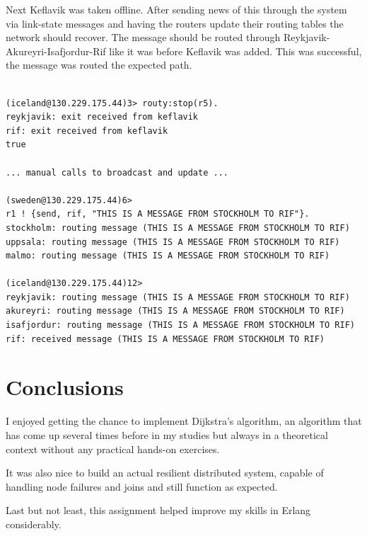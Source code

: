 \documentclass[a4paper, 11pt]{article}
\begin{document}
Next Keflavik was taken offline. After sending news of this through the system via link-state messages and having the routers update their routing tables the network should recover. The message should be routed through Reykjavik-Akureyri-Isafjordur-Rif like it was before Keflavik was added. This was successful, the message was routed the expected path.

\begin{verbatim}

(iceland@130.229.175.44)3> routy:stop(r5).
reykjavik: exit received from keflavik
rif: exit received from keflavik
true

... manual calls to broadcast and update ...

(sweden@130.229.175.44)6> 
r1 ! {send, rif, "THIS IS A MESSAGE FROM STOCKHOLM TO RIF"}.
stockholm: routing message (THIS IS A MESSAGE FROM STOCKHOLM TO RIF)
uppsala: routing message (THIS IS A MESSAGE FROM STOCKHOLM TO RIF)
malmo: routing message (THIS IS A MESSAGE FROM STOCKHOLM TO RIF)

(iceland@130.229.175.44)12>
reykjavik: routing message (THIS IS A MESSAGE FROM STOCKHOLM TO RIF)
akureyri: routing message (THIS IS A MESSAGE FROM STOCKHOLM TO RIF)
isafjordur: routing message (THIS IS A MESSAGE FROM STOCKHOLM TO RIF)
rif: received message (THIS IS A MESSAGE FROM STOCKHOLM TO RIF)

\end{verbatim}

\section{Conclusions}

I enjoyed getting the chance to implement Dijkstra's algorithm, an algorithm that has come up several times before in my studies but always in a theoretical context without any practical hands-on exercises.

It was also nice to build an actual resilient distributed system, capable of handling node failures and joins and still function as expected.

Last but not least, this assignment helped improve my skills in Erlang considerably.
\end{document}
